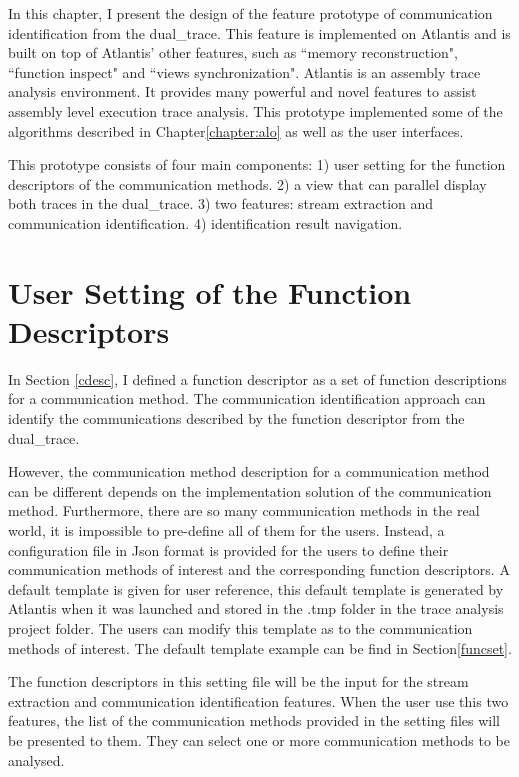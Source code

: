 

\label{chapter:newsol}
In this chapter, I present the design of the feature prototype of communication identification from the dual\_trace. This feature is implemented on Atlantis and is built on top of Atlantis' other features, such as ``memory reconstruction", ``function inspect" and ``views synchronization". Atlantis is an assembly trace analysis environment. It provides many powerful and novel features to assist assembly level execution trace analysis.\cite{huang2017atlantis} This prototype implemented some of the algorithms described in Chapter\ref{chapter:alo} as well as the user interfaces.

This prototype consists of four main components: 1) user setting for the function descriptors of the communication methods. 2) a view that can parallel display both traces in the dual\_trace. 3) two features: stream extraction and communication identification. 4) identification result navigation.

\section{User Setting of the Function Descriptors}\label{functionset}
In Section \ref{cdesc}, I defined a function descriptor as a set of function descriptions for a communication method. The communication identification approach can identify the communications described by the function descriptor from the dual\_trace.

However, the communication method description for a communication method can be different depends on the implementation solution of the communication method. Furthermore, there are so many communication methods in the real world, it is impossible to pre-define all of them for the users. Instead, a configuration file in Json format is provided for the users to define their communication methods of interest and the corresponding function descriptors. A default template is given for user reference, this default template is generated by Atlantis when it was launched and stored in the .tmp folder in the trace analysis project folder. The users can modify this template as to the communication methods of interest. The default template example can be find in Section\ref{funcset}.

The function descriptors in this setting file will be the input for the stream extraction and communication identification features. When the user use this two features, the list of the communication methods provided in the setting files will be presented to them. They can select one or more communication methods to be analysed. 

